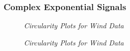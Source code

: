 \documentclass[./main.tex]{subfiles}
\begin{document}
\subsubsection{Complex Exponential Signals}

\begin{figure}[h]
	\centering 
	\resizebox{\textwidth}{!}{}
	\caption{\textit{Circularity Plots for Wind Data}}
	\label{fig:2_1_d_N}
\end{figure}

\begin{figure}[h]
	\centering 
	\resizebox{\textwidth}{!}{}
	\caption{\textit{Circularity Plots for Wind Data}}
	\label{fig:2_1_d_freq}
\end{figure}


 		
         
 		
\end{document}
